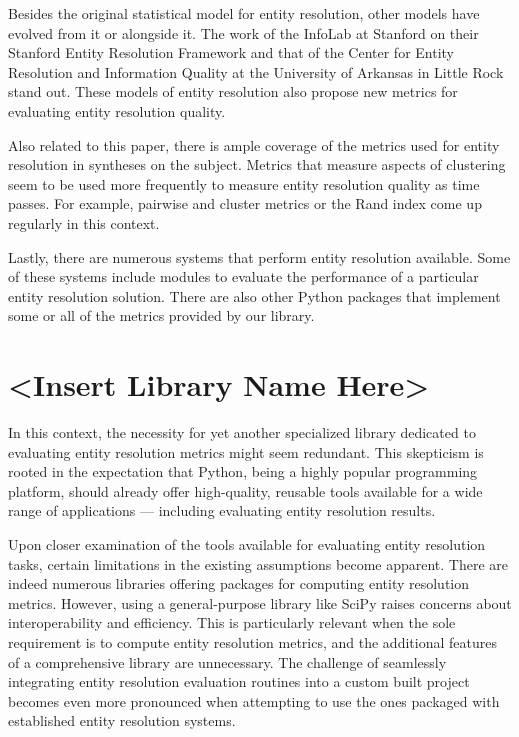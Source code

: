 \documentclass[a4paper,twoside]{article}
\begin{document}
    Besides the original statistical model for entity resolution, other models
    have evolved from it or alongside it.
    The work of the InfoLab at Stanford on their Stanford Entity Resolution
    Framework\cite{Ben2009Swoosh} and that of the Center for Entity Resolution
    and Information Quality at the University of Arkansas in Little
    Rock\cite{tal2007algebraic} stand out.
    These models of entity resolution also propose new metrics for evaluating
    entity resolution quality\cite{Men10,Tal11}.

    Also related to this paper, there is ample coverage of the metrics used for
    entity resolution in syntheses on the subject\cite{vldb2010,hitesh2012,Tal11}.
    Metrics that measure aspects of clustering seem to be used more frequently
    to measure entity resolution quality as time passes.
    For example, pairwise and cluster metrics\cite{Men10, huang2006efficient} or
    the Rand index\cite{tal2007algebraic} come up regularly in this context.

    Lastly, there are numerous systems that perform entity resolution available.
    Some of these systems include modules to evaluate the performance of a
    particular entity resolution solution\cite{fever2009,magellan2020,oyster2012}.
    There are also other Python packages that implement some or all of the
    metrics provided by our library\cite{nmeth2020scipy,ereval}.

    \section{<Insert Library Name Here>}\label{sec:library}

    In this context, the necessity for yet another specialized library dedicated
    to evaluating entity resolution metrics might seem redundant.
    This skepticism is rooted in the expectation that Python, being a highly
    popular programming platform, should already offer high-quality, reusable
    tools available for a wide range of applications --- including evaluating
    entity resolution results.
    
    Upon closer examination of the tools available for evaluating entity
    resolution tasks, certain limitations in the existing assumptions become
    apparent.
    There are indeed numerous libraries offering packages for computing entity
    resolution metrics.
    However, using a general-purpose library like SciPy raises concerns about
    interoperability and efficiency.
    This is particularly relevant when the sole requirement is to compute entity
    resolution metrics, and the additional features of a comprehensive library
    are unnecessary.
    The challenge of seamlessly integrating entity resolution evaluation
    routines into a custom built project becomes even more pronounced when
    attempting to use the ones packaged with established entity resolution
    systems\cite{oyster2012,jedai2017,deepm2020,magellan2020}.
    
\end{document}
